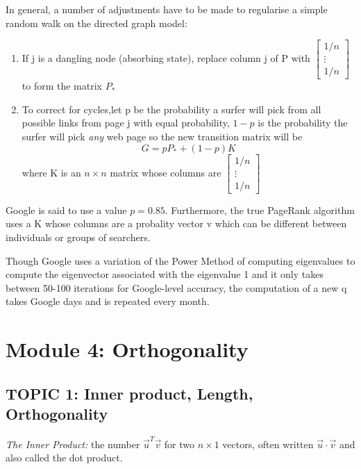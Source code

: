 \documentclass[12pt]{article} %
\begin{document}
In general, a number of adjustments have to be made to regularise a simple random walk on the directed graph model:
\begin{enumerate}
	\item If j is a dangling node (absorbing state), replace column j of P with $\begin{bmatrix}
		1/n\\
		\vdots\\
		1/n
	\end{bmatrix}$ to form the matrix $P_*$
	\item To correct for cycles,let p be the probability a surfer will pick from all possible links from page j with equal probability, $1 - p$ is the probability the surfer will pick \emph{any} web page so the new transition matrix will be 
	$$G = p P_* + (1 - p)K$$
	where K is an $n \times n$ matrix whose columns are $\begin{bmatrix}
		1/n\\
		\vdots\\
		1/n
	\end{bmatrix}$
\end{enumerate}

Google is said to use a value $p = 0.85$. Furthermore, the true PageRank algorithm uses a K whose columns are a probality vector v which can be different between individuals or groups of searchers.

Though Google uses a variation of the Power Method of computing eigenvalues to compute the eigenvector associated with the eigenvalue 1 and it only takes between 50-100 iterations for Google-level accuracy, the computation of a new q takes Google days and is repeated every month. 


\pagebreak
\section{Module 4: Orthogonality}
\subsection{TOPIC 1: Inner product, Length, Orthogonality}
\emph{The Inner Product:} the number $\vec{u}^T \vec{v}$ for two $n \times 1$ vectors, often written $\vec{u} \cdot \vec{v}$ and also called the dot product.
\end{document}
